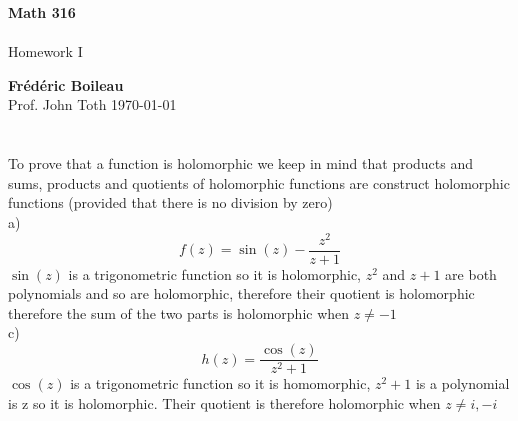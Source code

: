 \documentclass{article}
\begin{document}
	\begin{titlepage}
		\begin{center}
			\vspace*{1cm}
			\textbf{Math 316}\\
			\\
			\vspace{0.5cm}
			Homework I
			
			\vspace{1.5cm}
			
			\textbf{Frédéric Boileau}\\
			\vspace{2cm}
			Prof. 
			John Toth
			\vfill
			\today
			\thispagestyle{empty}
		\end{center}
	\end{titlepage}
	\newpage
	\tableofcontents
	\thispagestyle{empty}
	\clearpage
	
	\section{}
	\subsection{}
	To prove that a function is holomorphic we keep in mind that products and sums, products and quotients of holomorphic functions are construct holomorphic functions (provided that there is no division by zero)\\[2ex]
	a)
		\begin{equation*}
		f(z) = \sin(z) - \frac{z^2}{z+1}
	\end{equation*}
	$\sin(z)$ is a trigonometric function so it is holomorphic, $z^2$ and $z+1$ are both polynomials and so are holomorphic, therefore their quotient is holomorphic therefore the sum of the two parts is holomorphic when $z \neq -1$\\[2ex]
	c) 
		\begin{equation*}
			h(z) = \frac{\cos(z)}{z^2 + 1}
		\end{equation*}
	$\cos(z)$ is a trigonometric function so it is homomorphic, $z^2 +1 $ is a polynomial is z so it is holomorphic. Their quotient is therefore holomorphic when $z \neq i ,-i$\\[2ex]
	\subsection{}
	
\end{document}
